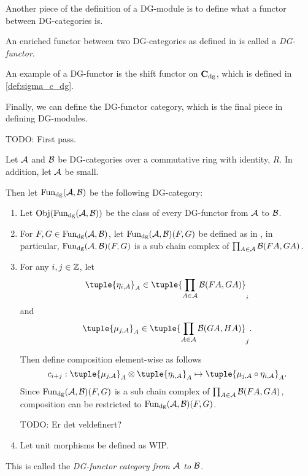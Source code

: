 Another piece of the definition of a DG-module is to define what a functor between DG-categories is.

\begin{definition}[DG-functor]
    An enriched functor between two DG-categories as defined in \cite[Definition 6.2.3]{Borceux_1994} is called a \emph{DG-functor}.
\end{definition}

An example of a DG-functor is the shift functor on \( \operatorname{\mathbf{C}}_{\operatorname{dg}} \), which is defined in \autoref{def:sigma_c_dg}.

Finally, we can define the DG-functor category, which is the final piece in defining DG-modules.

TODO: First pass.

\begin{definition}
    \label{def:dg_functor_category}
    Let \( {\mathcal{A}} \) and \( {\mathcal{B}} \) be DG-categories over a commutative ring with identity, \( R \). In addition, let \( {\mathcal{A}} \) be small.

    Then let \( \operatorname{Fun}_{\operatorname{dg}}({\mathcal{A}}, {\mathcal{B}}) \) be the following DG-category:
    \begin{enumerate}
        \item{
            Let \( \operatorname{Obj}(\operatorname{Fun}_{\operatorname{dg}}({\mathcal{A}}, {\mathcal{B}})) \) be the class of every DG-functor from \( {\mathcal{A}} \) to \( {\mathcal{B}} \).
        }
        \item{
            For \( F, G \in \operatorname{Fun}_{\operatorname{dg}}({\mathcal{A}}, {\mathcal{B}}) \), let \( \operatorname{Fun}_{\operatorname{dg}}({\mathcal{A}}, {\mathcal{B}})(F, G) \) be defined as in \cite[Proposition 6.3.1]{Borceux_1994}, in particular, \( \operatorname{Fun}_{\operatorname{dg}}({\mathcal{A}}, {\mathcal{B}})(F, G) \) is a sub chain complex of \( \prod_{A \in {\mathcal{A}}} {\mathcal{B}}(FA, GA) \).
        }
        \item {
            For any \( i, j \in {\mathbb{Z}} \), let
            \[
                \tuple{\eta_{i, A}}_A \in \tuple{\prod_{A \in \Ac} \Bc(FA, GA)}_i
            \]
            and
            \[
                \tuple{\mu_{j, A}}_A \in \tuple{\prod_{A \in \Ac} \Bc(GA, HA)}_j.
            \]

            Then define composition element-wise as follows
            \[
                c_{i + j}: \tuple{\mu_{j, A}}_A \otimes \tuple{\eta_{i, A}}_A \mapsto \tuple{\mu_{j, A} \circ \eta_{i, A}}_A.
            \]
            Since \( \operatorname{Fun}_{\operatorname{dg}}({\mathcal{A}}, {\mathcal{B}})(F, G) \) is a sub chain complex of \( \prod_{A \in {\mathcal{A}}} {\mathcal{B}}(FA, GA) \), composition can be restricted to \( \operatorname{Fun}_{\operatorname{dg}}({\mathcal{A}}, {\mathcal{B}})(F, G) \).

            TODO: Er det veldefinert?
        }
        \item {
            Let unit morphisms be defined as WIP.
        }
    \end{enumerate}
    This is called the \emph{DG-functor category from \( {\mathcal{A}} \) to \( {\mathcal{B}} \)}.
\end{definition}


